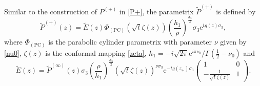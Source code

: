 \documentclass[11pt,a4paper]{article}
\numberwithin{equation}{section}
\begin{document}
Similar to the construction of ${P}^{(+)}$ in \eqref{P+}, the parametrix $\widetilde{P}^{(+)}$ is defined by
\begin{equation}\label{P+tilde}
\widetilde{P}^{(+)}(z)=\widetilde{E}(z)\Phi_{(\mathrm{PC})}\left(\sqrt{t}\zeta(z)\right)
\left(\frac{h_1}{\rho}\right)^{\frac{\sigma_3}{2}}\sigma_3\mathrm{e}^{tg(z)\sigma_3},
\end{equation}
where $\Phi_{(\mathrm{PC})}$ is the parabolic cylinder parametrix with parameter $\nu$ given by \eqref{nu0},
$\zeta(z)$ is the conformal mapping \eqref{zeta}, $h_1=-i\sqrt{2\pi}\mathrm{e}^{i\pi\nu_0}/\Gamma(\frac{1}{2}-\nu_0)$ and
\begin{equation}\label{Etilde-expression}
\widetilde{E}(z)=\widetilde{P}^{(\infty)}(z)\sigma_3
\left(\frac{\rho}{h_1}\right)^{\frac{\sigma_3}{2}}
\left(\sqrt{t}\zeta(z)\right)^{\nu\sigma_3}\mathrm{e}^{-tg(z_+)\sigma_3}
\begin{pmatrix}
1 & 0 \\ -\frac{1}{\sqrt{t}\zeta(z)} & 1
\end{pmatrix}.
\end{equation}
\end{document}
